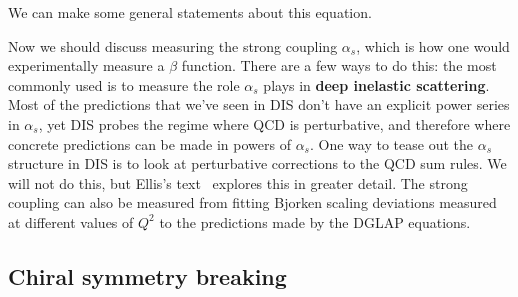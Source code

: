 \documentclass[11pt, oneside]{article}   	%
\theoremstyle{definition}
\numberwithin{equation}{subsection}		%
\begin{document}
We can make some general statements about this equation. 

Now we should discuss measuring the strong coupling $\alpha_s$, which is how one would experimentally measure a $\beta$ function. 
There are a few ways to do this: the most commonly used is to measure the role $\alpha_s$ plays in \textbf{deep inelastic scattering}. Most of the 
predictions that we've seen in DIS don't have an explicit power series in $\alpha_s$, yet DIS probes the regime where QCD is perturbative, 
and therefore where concrete predictions can be made in powers of $\alpha_s$. One way to tease out the $\alpha_s$ structure in DIS is to 
look at perturbative corrections to the QCD sum rules. We will not do this, but Ellis's text~\cite{ellis} explores this in greater detail. 
The strong coupling can also be measured from fitting Bjorken scaling deviations measured at different values of $Q^2$ to the predictions 
made by the DGLAP equations. 

\subsection{Chiral symmetry breaking}
\end{document}
